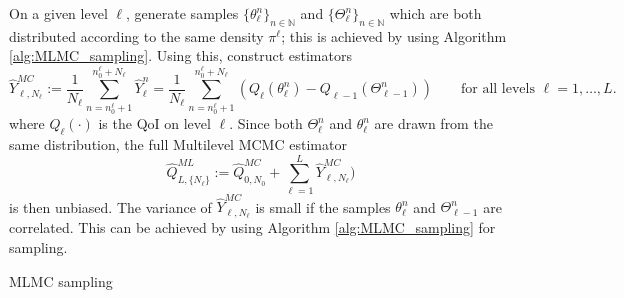 \documentclass[11pt]{article}
\begin{document}
On a given level $\ell$, generate samples $\{\theta_\ell^n\}_{n\in\mathbb{N}}$ and $\{\Theta_\ell^n\}_{n\in\mathbb{N}}$ which are both distributed according to the same density $\pi^\ell$; this is achieved by using Algorithm \ref{alg:MLMC_sampling}. Using this, construct estimators
\begin{equation}
  \hat{Y}_{\ell,N_\ell}^{MC} := \frac{1}{N_\ell}\sum_{n=n_0^\ell+1}^{n_0^\ell+N_\ell} \hat{Y}_\ell^n = \frac{1}{N_\ell}\sum_{n=n_0^\ell+1}^{n_0^\ell+N_\ell} \left(Q_\ell(\theta_\ell^n) - Q_{\ell-1}(\Theta_{\ell-1}^n)\right)
  \qquad\text{for all levels $\ell=1,\dots,L$}.\label{eqn:difference_estimator}
\end{equation}
where $Q_\ell(\cdot)$ is the QoI on level $\ell$. Since both $\Theta_\ell^n$ and $\theta_\ell^n$ are drawn from the same distribution, the full Multilevel MCMC estimator
\begin{equation}
  \hat{Q}_{L,\{N_\ell\}}^{ML} := \hat{Q}_{0,N_0}^{MC} + \sum_{\ell=1}^L \hat{Y}_{\ell,N_\ell}^{MC}\label{eqn:MLMCMCestimator})
\end{equation}
is then unbiased. The variance of $\hat{Y}_{\ell,N_\ell}^{MC}$ is small if the samples $\theta_\ell^n$ and $\Theta_{\ell-1}^n$ are correlated. This can be achieved by using Algorithm \ref{alg:MLMC_sampling} for sampling.
\begin{algorithm}
\caption{MLMC sampling}\label{alg:MLMC_sampling}
\begin{center}
\begin{algorithmic}[1]
\ENDFOR
\end{algorithmic}
\end{center}
\end{algorithm}
\end{document}
